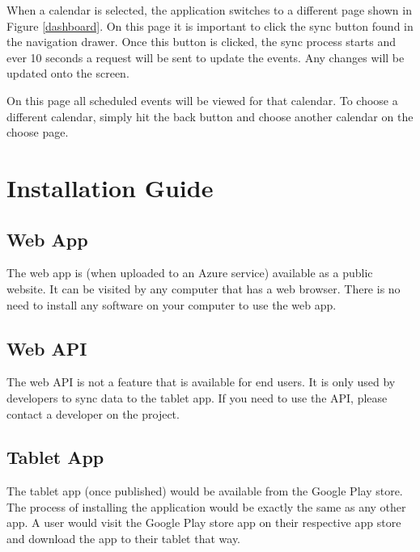 When a calendar is selected, the application switches to a different page shown in Figure \ref{dashboard}.  On this page it is important to click the sync button found in the navigation drawer.  Once this button is clicked, the sync process starts and ever 10 seconds a request will be sent to update the events.  Any changes will be updated onto the screen.



On this page all scheduled events will be viewed for that calendar.  To choose a different calendar, simply hit the back button and choose another calendar on the choose page.  








\pagebreak
\section{Installation Guide}
\subsection{Web App}
The web app is (when uploaded to an Azure service) available as a public website. It can be visited by any computer that has a web browser. There is no need to install any software on your computer to use the web app.

\subsection{Web API}
The web API is not a feature that is available for end users. It is only used by developers to sync data to the tablet app. If you need to use the API, please contact a developer on the project.

\subsection{Tablet App}
The tablet app (once published) would be available from the Google Play store. The process of installing the application would be exactly the same as any other app. A user would visit the Google Play store app on their respective app store and download the app to their tablet that way.

